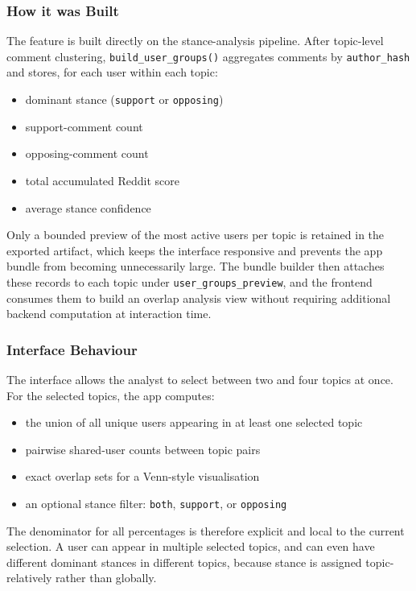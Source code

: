 \documentclass[11pt,a4paper]{article}
\begin{document}
\subsubsection{How it was Built}

The feature is built directly on the stance-analysis pipeline. After topic-level comment clustering, \texttt{build\_user\_groups()} aggregates comments by \texttt{author\_hash} and stores, for each user within each topic:

\begin{itemize}
  \item dominant stance (\texttt{support} or \texttt{opposing})
  \item support-comment count
  \item opposing-comment count
  \item total accumulated Reddit score
  \item average stance confidence
\end{itemize}

Only a bounded preview of the most active users per topic is retained in the exported artifact, which keeps the interface responsive and prevents the app bundle from becoming unnecessarily large. The bundle builder then attaches these records to each topic under \texttt{user\_groups\_preview}, and the frontend consumes them to build an overlap analysis view without requiring additional backend computation at interaction time.

\subsubsection{Interface Behaviour}

The interface allows the analyst to select between two and four topics at once. For the selected topics, the app computes:

\begin{itemize}
  \item the union of all unique users appearing in at least one selected topic
  \item pairwise shared-user counts between topic pairs
  \item exact overlap sets for a Venn-style visualisation
  \item an optional stance filter: \texttt{both}, \texttt{support}, or \texttt{opposing}
\end{itemize}

The denominator for all percentages is therefore explicit and local to the current selection. A user can appear in multiple selected topics, and can even have different dominant stances in different topics, because stance is assigned topic-relatively rather than globally.
\end{document}

